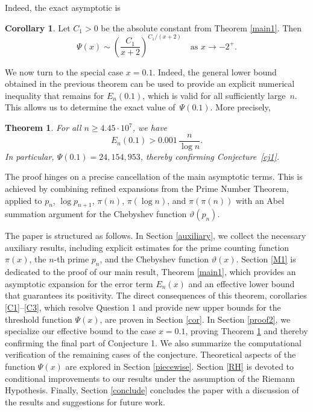 \documentclass[10pt]{amsart}
\newtheorem{theorem}{Theorem}[section]
\theoremstyle{definition} %
\newtheorem{corollary}{Corollary}[section]
\numberwithin{equation}{section}
\def\dfrac {\displaystyle\frac}
\def\dfrac {\displaystyle\frac}
\begin{document}
Indeed, the exact asymptotic is

\begin{corollary}\label{C2}
Let $C_1>0$ be the absolute constant from Theorem \ref{main1}. Then
\[
\Psi(x) \sim \left( \dfrac{C_1}{x+2} \right)^{C_1/(x+2)} \quad \text{as } x \to -2^+.
\]
\end{corollary}


We now turn to the special case $x=0.1$. Indeed, the general lower bound obtained in the previous theorem can be 
used to provide an explicit 
numerical inequality that remains for $E_n(0.1)$, which is valid for all sufficiently large~$n$.  
This allows us to determine the exact value of~$\Psi(0.1)$. More precisely,
\begin{theorem}\label{main2}
For all $n \ge 4.45\cdot 10^7$, we have
\begin{equation}\label{eqm3}
E_n(0.1) > 0.001\,\dfrac{n}{\log n}.
\end{equation}
In particular, $\Psi(0.1)=24,154,953$, thereby confirming Conjecture~\ref{cj1}.
\end{theorem}


The proof hinges on a precise cancellation of the main asymptotic terms. This is achieved by combining refined expansions from the Prime Number Theorem, applied to $p_n$, $\log p_{n+1}$, $\pi(n)$, $\pi(\log n)$, and $\pi(\pi(n))$ with an Abel summation argument for the Chebyshev function $\vartheta(p_n)$.

The paper is structured as follows. In Section \ref{auxiliary}, we collect the necessary auxiliary results, including explicit estimates for the prime counting function \(\pi(x)\), the \(n\)-th prime \(p_n\), and the Chebyshev function \(\vartheta(x)\). Section \ref{M1} is dedicated to the proof of our main result, Theorem \ref{main1}, which provides an asymptotic expansion for the error term \(E_n(x)\) and an effective lower bound that guarantees its positivity. The direct consequences of this theorem, corollaries \ref{C1}--\ref{C3}, which resolve Question 1 and provide new upper bounds for the threshold function \(\Psi(x)\), are proven in Section \ref{cor}. In Section \ref{proof2}, we specialize our effective bound to the case \(x = 0.1\), proving Theorem \ref{main2} and thereby confirming the final part of Conjecture 1. We also summarize the computational verification of the remaining cases of the conjecture. Theoretical aspects of the function $\Psi(x)$ are explored in Section \ref{piecewise}. Section \ref{RH} is devoted to conditional improvements to our results under the assumption of the Riemann Hypothesis. Finally, Section \ref{conclude} concludes the paper with a discussion of the results and suggestions for future work.
\end{document}
